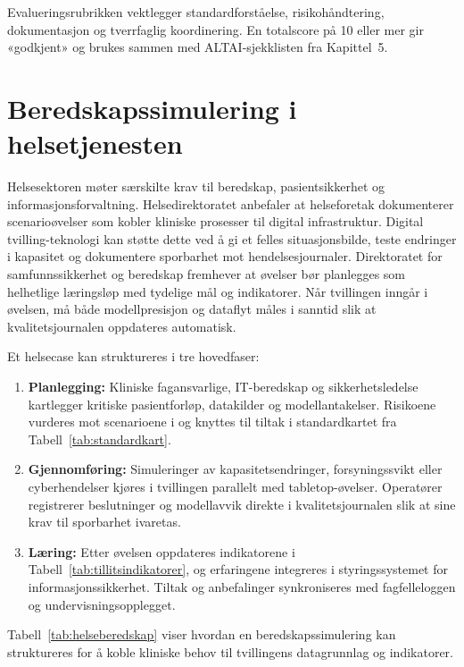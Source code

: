 Evalueringsrubrikken vektlegger standardforståelse, risikohåndtering, dokumentasjon og tverrfaglig koordinering. En totalscore på 10 eller mer gir «godkjent» og brukes sammen med ALTAI-sjekklisten fra Kapittel~5.

\section{Beredskapssimulering i helsetjenesten}
Helsesektoren møter særskilte krav til beredskap, pasientsikkerhet og informasjonsforvaltning. Helsedirektoratet \citet{helsedir2023beredskap} anbefaler at helseforetak dokumenterer scenarioøvelser som kobler kliniske prosesser til digital infrastruktur. Digital tvilling-teknologi kan støtte dette ved å gi et felles situasjonsbilde, teste endringer i kapasitet og dokumentere sporbarhet mot hendelsesjournaler. Direktoratet for samfunnssikkerhet og beredskap \citet{dsb2023ovelser} fremhever at øvelser bør planlegges som helhetlige læringsløp med tydelige mål og indikatorer. Når tvillingen inngår i øvelsen, må både modellpresisjon og dataflyt måles i sanntid slik at kvalitetsjournalen oppdateres automatisk.

Et helsecase kan struktureres i tre hovedfaser:
\begin{enumerate}
    \item \textbf{Planlegging:} Kliniske fagansvarlige, IT-beredskap og sikkerhetsledelse kartlegger kritiske pasientforløp, datakilder og modellantakelser. Risikoene vurderes mot scenarioene i \citet{dsb2023nrb} og knyttes til tiltak i standardkartet fra Tabell~\ref{tab:standardkart}.
    \item \textbf{Gjennomføring:} Simuleringer av kapasitetsendringer, forsyningssvikt eller cyberhendelser kjøres i tvillingen parallelt med tabletop-øvelser. Operatører registrerer beslutninger og modellavvik direkte i kvalitetsjournalen slik at \citet{dnv2023digitalassurance} sine krav til sporbarhet ivaretas.
    \item \textbf{Læring:} Etter øvelsen oppdateres indikatorene i Tabell~\ref{tab:tillitsindikatorer}, og erfaringene integreres i styringssystemet for informasjonssikkerhet. Tiltak og anbefalinger synkroniseres med fagfelleloggen og undervisningsopplegget.
\end{enumerate}

Tabell~\ref{tab:helseberedskap} viser hvordan en beredskapssimulering kan struktureres for å koble kliniske behov til tvillingens datagrunnlag og indikatorer.

